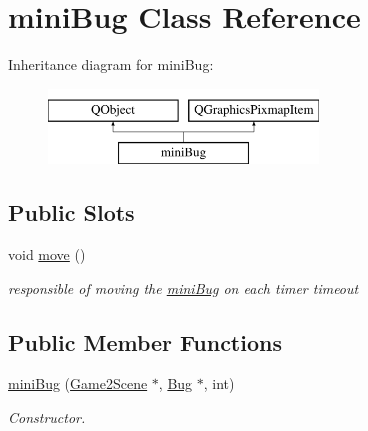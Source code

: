 \hypertarget{classminiBug}{\section{mini\-Bug Class Reference}
\label{classminiBug}
}
Inheritance diagram for mini\-Bug\-:\begin{figure}[H]
\begin{center}
\leavevmode
\includegraphics[height=2.000000cm]{classminiBug}
\end{center}
\end{figure}
\subsection*{Public Slots}
\begin{DoxyCompactItemize}
\item 
\hypertarget{classminiBug_a990a1d581da44901dd81386e4196a766}{void \hyperlink{classminiBug_a990a1d581da44901dd81386e4196a766}{move} ()}\label{classminiBug_a990a1d581da44901dd81386e4196a766}

\begin{DoxyCompactList}\small\item\em responsible of moving the \hyperlink{classminiBug}{mini\-Bug} on each timer timeout \end{DoxyCompactList}\end{DoxyCompactItemize}
\subsection*{Public Member Functions}
\begin{DoxyCompactItemize}
\item 
\hypertarget{classminiBug_a38ba11cf31a4539b7d2993370bfe92a7}{\hyperlink{classminiBug_a38ba11cf31a4539b7d2993370bfe92a7}{mini\-Bug} (\hyperlink{classGame2Scene}{Game2\-Scene} $\ast$, \hyperlink{classBug}{Bug} $\ast$, int)}\label{classminiBug_a38ba11cf31a4539b7d2993370bfe92a7}

\begin{DoxyCompactList}\small\item\em Constructor. \end{DoxyCompactList}\end{DoxyCompactItemize}
